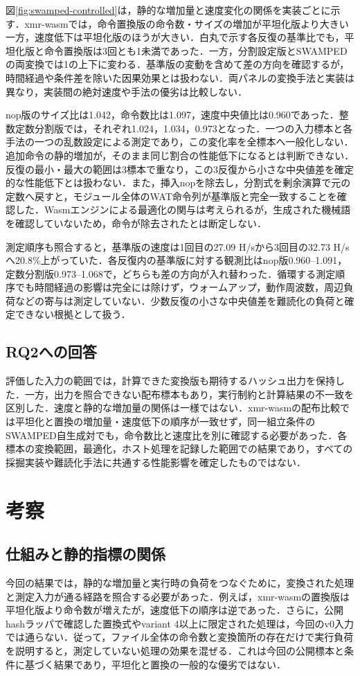 \documentclass[submit,techrep]{ipsj}
\begin{document}
図\ref{fig:swamped-controlled}は，静的な増加量と速度変化の関係を実装ごとに示す．xmr-wasmでは，命令置換版の命令数・サイズの増加が平坦化版より大きい一方，速度低下は平坦化版のほうが大きい．白丸で示す各反復の基準比でも，平坦化版と命令置換版は3回とも1未満であった．一方，分割設定版とSWAMPEDの両変換では1の上下に変わる．基準版の変動を含めて差の方向を確認するが，時間経過や条件差を除いた因果効果とは扱わない．両パネルの変換手法と実装は異なり，実装間の絶対速度や手法の優劣は比較しない．

nop版のサイズ比は1.042，命令数比は1.097，速度中央値比は0.960であった．整数定数分割版では，それぞれ1.024，1.034，0.973となった．一つの入力標本と各手法の一つの乱数設定による測定であり，この変化率を全標本へ一般化しない．追加命令の静的増加が，そのまま同じ割合の性能低下になるとは判断できない．反復の最小・最大の範囲は3標本で重なり，この3反復から小さな中央値差を確定的な性能低下とは扱わない．また，挿入nopを除去し，分割式を剰余演算で元の定数へ戻すと，モジュール全体のWAT命令列が基準版と完全一致することを確認した．Wasmエンジンによる最適化の関与は考えられるが，生成された機械語を確認していないため，命令が除去されたとは断定しない．

測定順序も照合すると，基準版の速度は1回目の27.09 H/sから3回目の32.73 H/sへ20.8\%上がっていた．各反復内の基準版に対する観測比はnop版0.960--1.091，定数分割版0.973--1.068で，どちらも差の方向が入れ替わった．循環する測定順序でも時間経過の影響は完全には除けず，ウォームアップ，動作周波数，周辺負荷などの寄与は測定していない．少数反復の小さな中央値差を難読化の負荷と確定できない根拠として扱う．

\subsection{RQ2への回答}
\label{sec:rq2-answer}
評価した入力の範囲では，計算できた変換版も期待するハッシュ出力を保持した．一方，出力を照合できない配布標本もあり，実行制約と計算結果の不一致を区別した．速度と静的な増加量の関係は一様ではない．xmr-wasmの配布比較では平坦化と置換の増加量・速度低下の順序が一致せず，同一組立条件のSWAMPED自生成対でも，命令数比と速度比を別に確認する必要があった．各標本の変換範囲，最適化，ホスト処理を記録した範囲での結果であり，すべての採掘実装や難読化手法に共通する性能影響を確定したものではない．

\section{考察}
\subsection{仕組みと静的指標の関係}
今回の結果では，静的な増加量と実行時の負荷をつなぐために，変換された処理と測定入力が通る経路を照合する必要があった．例えば，xmr-wasmの置換版は平坦化版より命令数が増えたが，速度低下の順序は逆であった．さらに，公開hashラッパで確認した置換式やvariant 4以上に限定された処理は，今回のv0入力では通らない．従って，ファイル全体の命令数と変換箇所の存在だけで実行負荷を説明すると，測定していない処理の効果を混ぜる．これは今回の公開標本と条件に基づく結果であり，平坦化と置換の一般的な優劣ではない．
\end{document}
